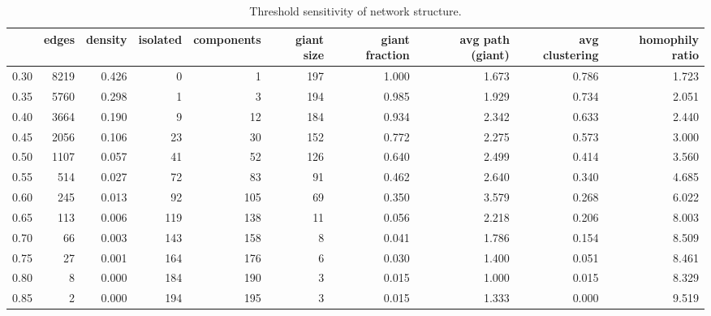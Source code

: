 \begin{table}
\centering
\caption{Threshold sensitivity of network structure.}
\label{tab:threshold}
\begin{adjustbox}{max width=\textwidth}
\begin{tabular}{lrrrrrrrrr}
\toprule
 & edges & density & isolated & components & giant size & giant fraction & avg path (giant) & avg clustering & homophily ratio \\
\midrule
0.30 & 8219 & 0.426 & 0 & 1 & 197 & 1.000 & 1.673 & 0.786 & 1.723 \\
0.35 & 5760 & 0.298 & 1 & 3 & 194 & 0.985 & 1.929 & 0.734 & 2.051 \\
0.40 & 3664 & 0.190 & 9 & 12 & 184 & 0.934 & 2.342 & 0.633 & 2.440 \\
0.45 & 2056 & 0.106 & 23 & 30 & 152 & 0.772 & 2.275 & 0.573 & 3.000 \\
0.50 & 1107 & 0.057 & 41 & 52 & 126 & 0.640 & 2.499 & 0.414 & 3.560 \\
0.55 & 514 & 0.027 & 72 & 83 & 91 & 0.462 & 2.640 & 0.340 & 4.685 \\
0.60 & 245 & 0.013 & 92 & 105 & 69 & 0.350 & 3.579 & 0.268 & 6.022 \\
0.65 & 113 & 0.006 & 119 & 138 & 11 & 0.056 & 2.218 & 0.206 & 8.003 \\
0.70 & 66 & 0.003 & 143 & 158 & 8 & 0.041 & 1.786 & 0.154 & 8.509 \\
0.75 & 27 & 0.001 & 164 & 176 & 6 & 0.030 & 1.400 & 0.051 & 8.461 \\
0.80 & 8 & 0.000 & 184 & 190 & 3 & 0.015 & 1.000 & 0.015 & 8.329 \\
0.85 & 2 & 0.000 & 194 & 195 & 3 & 0.015 & 1.333 & 0.000 & 9.519 \\
\bottomrule
\end{tabular}
\end{adjustbox}
\end{table}
